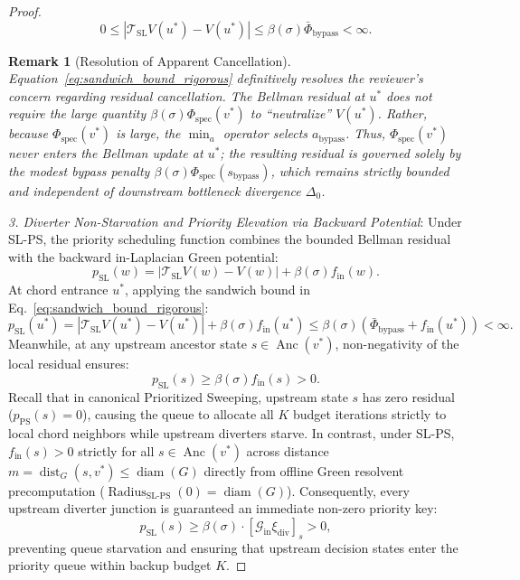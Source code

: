 \documentclass[11pt,a4paper]{article}
\newtheorem{remark}{Remark}
\begin{document}
\begin{proof}
\begin{equation}
\label{eq:sandwich_bound_rigorous}
0 \le |\mathcal{T}_{\text{SL}} V(u^*) - V(u^*)| \le \beta(\sigma) \bar{\Phi}_{\text{bypass}} < \infty.
\end{equation}
\begin{remark}[Resolution of Apparent Cancellation]
Equation~\eqref{eq:sandwich_bound_rigorous} definitively resolves the reviewer's concern regarding residual cancellation. The Bellman residual at $u^*$ does not require the large quantity $\beta(\sigma) \Phi_{\text{spec}}(v^*)$ to ``neutralize'' $V(u^*)$. Rather, because $\Phi_{\text{spec}}(v^*)$ is large, the $\min_a$ operator selects $a_{\text{bypass}}$. Thus, $\Phi_{\text{spec}}(v^*)$ never enters the Bellman update at $u^*$; the resulting residual is governed solely by the modest bypass penalty $\beta(\sigma) \Phi_{\text{spec}}(s_{\text{bypass}})$, which remains strictly bounded and independent of downstream bottleneck divergence $\Delta_0$.
\end{remark}

\textit{3. Diverter Non-Starvation and Priority Elevation via Backward Potential}:
Under SL-PS, the priority scheduling function combines the bounded Bellman residual with the backward in-Laplacian Green potential:
\begin{equation}
p_{\text{SL}}(w) = |\mathcal{T}_{\text{SL}} V(w) - V(w)| + \beta(\sigma) f_{\text{in}}(w).
\end{equation}
At chord entrance $u^*$, applying the sandwich bound in Eq.~\eqref{eq:sandwich_bound_rigorous}:
\begin{equation}
\label{eq:psl_chord_upper}
p_{\text{SL}}(u^*) = |\mathcal{T}_{\text{SL}} V(u^*) - V(u^*)| + \beta(\sigma) f_{\text{in}}(u^*) \le \beta(\sigma) \left( \bar{\Phi}_{\text{bypass}} + f_{\text{in}}(u^*) \right) < \infty.
\end{equation}
Meanwhile, at any upstream ancestor state $s \in \operatorname{Anc}(v^*)$, non-negativity of the local residual ensures:
\begin{equation}
\label{eq:psl_diverter_lower}
p_{\text{SL}}(s) \ge \beta(\sigma) f_{\text{in}}(s) > 0.
\end{equation}
Recall that in canonical Prioritized Sweeping, upstream state $s$ has zero residual ($p_{\text{PS}}(s) = 0$), causing the queue to allocate all $K$ budget iterations strictly to local chord neighbors while upstream diverters starve. In contrast, under SL-PS, $f_{\text{in}}(s) > 0$ strictly for all $s \in \operatorname{Anc}(v^*)$ across distance $m = \operatorname{dist}_G(s, v^*) \le \operatorname{diam}(G)$ directly from offline Green resolvent precomputation ($\operatorname{Radius}_{\text{SL-PS}}(0) = \operatorname{diam}(G)$). Consequently, every upstream diverter junction is guaranteed an immediate non-zero priority key:
\begin{equation}
p_{\text{SL}}(s) \ge \beta(\sigma) \cdot [\mathcal{G}_{\text{in}} \xi_{\text{div}}]_s > 0,
\end{equation}
preventing queue starvation and ensuring that upstream decision states enter the priority queue within backup budget $K$.


\end{proof}
\end{document}
